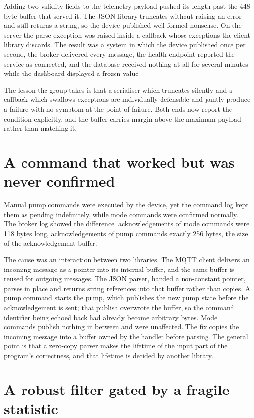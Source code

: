 Adding two validity fields to the telemetry payload pushed its length past the 448 byte buffer that served it. The JSON library truncates without raising an error and still returns a string, so the device published well formed nonsense. On the server the parse exception was raised inside a callback whose exceptions the client library discards. The result was a system in which the device published once per second, the broker delivered every message, the health endpoint reported the service as connected, and the database received nothing at all for several minutes while the dashboard displayed a frozen value.

The lesson the group takes is that a serialiser which truncates silently and a callback which swallows exceptions are individually defensible and jointly produce a failure with no symptom at the point of failure. Both ends now report the condition explicitly, and the buffer carries margin above the maximum payload rather than matching it.

\section{A command that worked but was never confirmed}

Manual pump commands were executed by the device, yet the command log kept them as pending indefinitely, while mode commands were confirmed normally. The broker log showed the difference: acknowledgements of mode commands were 118 bytes long, acknowledgements of pump commands exactly 256 bytes, the size of the acknowledgement buffer.

The cause was an interaction between two libraries. The MQTT client delivers an incoming message as a pointer into its internal buffer, and the same buffer is reused for outgoing messages. The JSON parser, handed a non-constant pointer, parses in place and returns string references into that buffer rather than copies. A pump command starts the pump, which publishes the new pump state before the acknowledgement is sent; that publish overwrote the buffer, so the command identifier being echoed back had already become arbitrary bytes. Mode commands publish nothing in between and were unaffected. The fix copies the incoming message into a buffer owned by the handler before parsing. The general point is that a zero-copy parser makes the lifetime of the input part of the program's correctness, and that lifetime is decided by another library.

\section{A robust filter gated by a fragile statistic}

